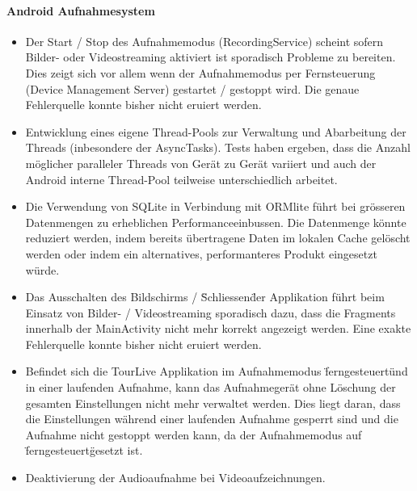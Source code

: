 \paragraph{Android Aufnahmesystem}
\begin{itemize}
	\item Der Start / Stop des Aufnahmemodus (RecordingService) scheint sofern Bilder- oder Videostreaming aktiviert ist sporadisch Probleme zu bereiten. Dies zeigt sich vor allem wenn der Aufnahmemodus per Fernsteuerung (Device Management Server) gestartet / gestoppt wird. Die genaue Fehlerquelle konnte bisher nicht eruiert werden.
	\item Entwicklung eines eigene Thread-Pools zur Verwaltung und Abarbeitung der Threads (inbesondere der AsyncTasks). Tests haben ergeben, dass die Anzahl möglicher paralleler Threads von Gerät zu Gerät variiert und auch der Android interne Thread-Pool teilweise unterschiedlich arbeitet. 
	\item Die Verwendung von SQLite in Verbindung mit ORMlite führt bei grösseren Datenmengen zu erheblichen Performanceeinbussen. Die Datenmenge könnte reduziert werden, indem bereits übertragene Daten im lokalen Cache gelöscht werden oder indem ein alternatives, performanteres Produkt eingesetzt würde.
	\item Das Ausschalten des Bildschirms / \"Schliessen\" der Applikation führt beim Einsatz von Bilder- / Videostreaming sporadisch dazu, dass die Fragments innerhalb der MainActivity nicht mehr korrekt angezeigt werden. Eine exakte Fehlerquelle konnte bisher nicht eruiert werden. 
	\item Befindet sich die TourLive Applikation im Aufnahmemodus \"ferngesteuert\" und in einer laufenden Aufnahme, kann das Aufnahmegerät ohne Löschung der gesamten Einstellungen nicht mehr verwaltet werden. Dies liegt daran, dass die Einstellungen während einer laufenden Aufnahme gesperrt sind und die Aufnahme nicht gestoppt werden kann, da der Aufnahmemodus auf \"ferngesteuert\" gesetzt ist. 
	\item Deaktivierung der Audioaufnahme bei Videoaufzeichnungen.
	
\end{itemize}

